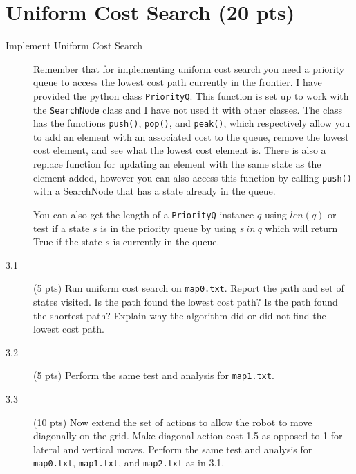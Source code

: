 \documentclass[11pt]{hermans-hw}
\begin{document}
\section{Uniform Cost Search (20 pts)}
\begin{description}
\item[Implement Uniform Cost Search] Remember that for implementing uniform cost search you need a priority queue to access the lowest cost path currently in the frontier. I have provided the python class \texttt{PriorityQ}. This function is set up to work with the \texttt{SearchNode} class and I have not used it with other classes. The class has the functions \texttt{push()}, \texttt{pop()}, and \texttt{peak()}, which respectively allow you to add an element with an associated cost to the queue, remove the lowest cost element, and see what the lowest cost element is. There is also a replace function for updating an element with the same state as the element added, however you can also access this function by calling \texttt{push()} with a SearchNode that has a state already in the queue.

You can also get the length of a \texttt{PriorityQ} instance \(q\) using \(len(q)\) or test if a state \(s\) is in the priority queue by using \(s\ in\ q\) which will return True if the state \(s\) is currently in the queue.

\item[3.1] (5 pts) Run uniform cost search on \texttt{map0.txt}. Report the path and set of states visited. Is the path found the lowest cost path?
Is the path found the shortest path? Explain why the algorithm did or did not find the lowest cost path.
\item[3.2] (5 pts) Perform the same test and analysis for \texttt{map1.txt}.
\item[3.3] (10 pts) Now extend the set of actions to allow the robot to move diagonally on the grid. Make diagonal action cost 1.5 as opposed to 1 for lateral and vertical moves. Perform the same test and analysis for \texttt{map0.txt}, \texttt{map1.txt}, and \texttt{map2.txt} as in 3.1.

\end{description}
\end{document}

